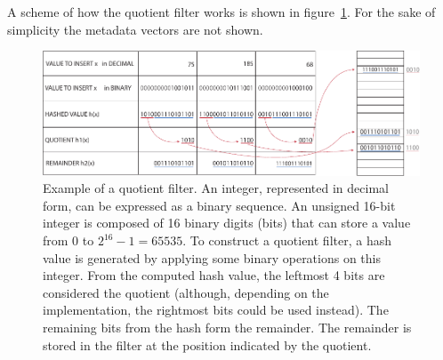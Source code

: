 A scheme of how the quotient filter works is shown in figure~\ref{fig:qf_ex}. For the sake of simplicity the metadata vectors are not shown.
\begin{figure}[h!]
	\centering
	\includegraphics[width=.95\linewidth]{figures/kmer_methods/quotient_filter_export.pdf}
	\caption[Example of a quotient filter.]{Example of a quotient filter. An integer, represented in decimal form, can be expressed as a binary sequence. An unsigned 16-bit integer is composed of 16 binary digits (bits) that can store a value from $0$ to $2^{16}-1 = 65535$. To construct a quotient filter, a hash value is generated by applying some binary operations on this integer. From the computed hash value, the leftmost 4 bits are considered the quotient (although, depending on the implementation, the rightmost bits could be used instead). The remaining bits from the hash form the remainder. The remainder is stored in the filter at the position indicated by the quotient. }
	\label{fig:qf_ex}
\end{figure}
